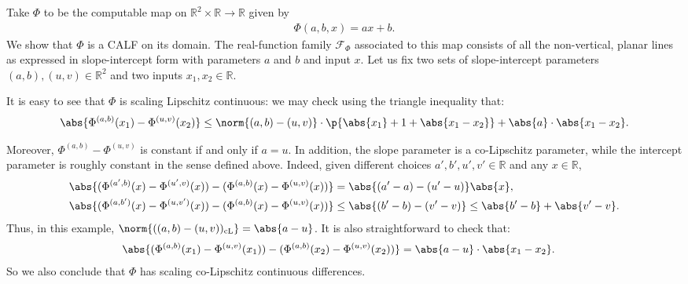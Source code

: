 \begin{example}
    \label{example:lines}
    Take $\Phi$ to be the computable map on $\mathbb{R}^2 \times \mathbb{R} \to \mathbb{R}$ given by
    \begin{align*}
        \Phi(a, b, x) = ax + b.
    \end{align*}
    We show that $\Phi$ is a CALF on its domain. The real-function family $\mathcal{F}_\Phi$ associated to this map consists of all the non-vertical, planar lines as expressed in slope-intercept form with parameters $a$ and $b$ and input $x$. Let us fix two sets of slope-intercept parameters $(a, b), (u, v) \in \mathbb{R}^2$ and two inputs $x_1, x_2 \in \mathbb{R}$.

    It is easy to see that $\Phi$ is scaling Lipschitz continuous: we may check using the triangle inequality that: 
    \begin{align*}
        \abs{\Phi^{(a, b)}(x_1) - \Phi^{(u, v)}(x_2)} \leq \norm{(a, b) - (u, v)} \cdot \p{\abs{x_1} + 1 + \abs{x_1 - x_2}} + \abs{a} \cdot \abs{x_1 - x_2}.
    \end{align*}

    Moreover, $\Phi^{(a, b)} - \Phi^{(u, v)}$ is constant if and only if $a = u$. In addition, the slope parameter is a co-Lipschitz parameter, while the intercept parameter is roughly constant in the sense defined above. Indeed, given different choices $a', b', u', v' \in \mathbb{R}$ and any $x \in \mathbb{R}$,
    \begin{align*}
        \abs{(\Phi^{(a', b)}(x) - \Phi^{(u', v)}(x)) - (\Phi^{(a, b)}(x) - \Phi^{(u, v)}(x))} &= \abs{(a' - a) - (u' - u)} \abs{x},\\
        \abs{(\Phi^{(a, b')}(x) - \Phi^{(u, v')}(x)) - (\Phi^{(a, b)}(x) - \Phi^{(u, v)}(x))}&\leq \abs{(b' - b) - (v' - v)} \leq \abs{b' - b} + \abs{v' - v}.
    \end{align*}
    Thus, in this example, $\norm{((a, b) - (u, v))_{\operatorname{cL}}} = \abs{a - u}$. It is also straightforward to check that:
    \begin{align*}
        \abs{(\Phi^{(a, b)}(x_1) - \Phi^{(u, v)}(x_1)) - (\Phi^{(a, b)}(x_2) - \Phi^{(u, v)}(x_2))} &= \abs{a - u} \cdot \abs{x_1 - x_2}.
    \end{align*}
    So we also conclude that $\Phi$ has scaling co-Lipschitz continuous differences.


\end{example}

